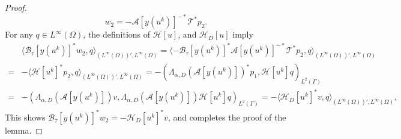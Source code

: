 \documentclass[onefignum,onetabnum]{siamart190516}
\numberwithin{equation}{section}
\begin{document}
\begin{proof}
$$w_{2} = -\mathcal{A}[y(u^{k})]^{-*} \mathcal{T}^{*} p_{2}.$$
For any $q \in L^{\infty}(\Omega)$, the definitions of $\mathcal{H}[u]$, and $\mathcal{H}_{D}[u]$ imply
\begin{align*}
&\langle \mathcal{B}_{\tau}[y(u^{k})]^{*} w_{2}, q \rangle_{(L^{\infty}(\Omega))', L^{\infty}(\Omega)} = \langle -\mathcal{B}_{\tau}[y(u^{k})]^{*} \mathcal{A}[y(u^{k})]^{-*} \mathcal{T}^{*} p_{2}, q \rangle_{(L^{\infty}(\Omega))', L^{\infty}(\Omega)} \\
{=}& -\langle \mathcal{H}[u^{k}]^{*} p_{2}, q \rangle_{(L^{\infty}(\Omega))', L^{\infty}(\Omega)} 
= -(\Lambda_{\alpha,D}(\mathcal{A}[y(u^{k})])^{*} p_{1}, \mathcal{H}[u^{k}] q)_{L^{2}(\Gamma)}\\
=& -(\Lambda_{\alpha,D}(\mathcal{A}[y(u^{k})]) v, \Lambda_{\alpha,D}(\mathcal{A}[y(u^{k})]) \mathcal{H}[u^{k}] q)_{L^{2}(\Gamma)}{=}-\langle \mathcal{H}_{D}[u^{k}]^{*} v, q \rangle_{(L^{\infty}(\Omega))', L^{\infty}(\Omega)},
\end{align*}
This shows $\mathcal{B}_{\tau}[y(u^{k})]^{*} w_{2} = -\mathcal{H}_{D}[u^{k}]^{*} v$, and completes the proof of the lemma.
\end{proof}
\end{document}
